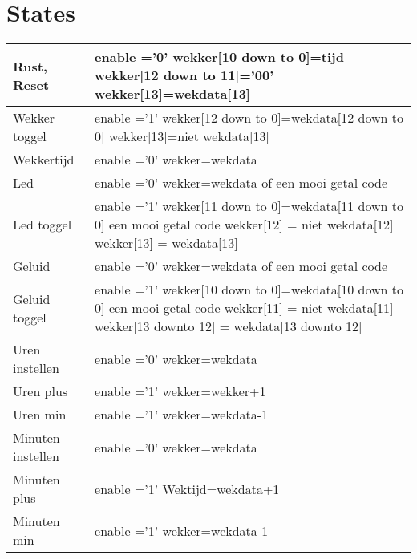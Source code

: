 \documentclass[a4paper, oneside, 10pt]{article}
\begin{document}
\section{States}
\begin{longtable}{|l| p{10cm} |}
\hline
Rust, Reset &
enable ='0' \newline
wekker[10 down to 0]=tijd \newline
wekker[12 down to 11]='00' \newline
wekker[13]=wekdata[13] \\ \hline
Wekker toggel &
enable ='1' \newline
wekker[12 down to 0]=wekdata[12 down to 0] \newline
wekker[13]=niet wekdata[13] \\ \hline
Wekkertijd &
enable ='0' \newline
wekker=wekdata \\ \hline
Led &
enable ='0' \newline
wekker=wekdata of een mooi getal code \\ \hline
Led toggel &
enable ='1' \newline
wekker[11 down to 0]=wekdata[11 down to 0] een mooi getal code \newline
wekker[12] = niet wekdata[12] \newline
wekker[13] = wekdata[13] \\ \hline
Geluid & 
enable ='0' \newline
wekker=wekdata of een mooi getal code \\ \hline
Geluid toggel &
enable ='1' \newline
wekker[10 down to 0]=wekdata[10 down to 0] een mooi getal code \newline
wekker[11] = niet wekdata[11] \newline
wekker[13 downto 12] = wekdata[13 downto 12] \\ \hline
Uren instellen &
enable ='0' \newline
wekker=wekdata \\ \hline
Uren plus &
enable ='1' \newline
wekker=wekker+1 \\ \hline
Uren min &
enable ='1' \newline
wekker=wekdata-1 \\ \hline
Minuten instellen &
enable ='0' \newline
wekker=wekdata \\ \hline
Minuten plus &
enable ='1' \newline
Wektijd=wekdata+1 \\ \hline
Minuten min &
enable ='1' \newline
wekker=wekdata-1 \\ \hline
\end{longtable}
\end{document}
